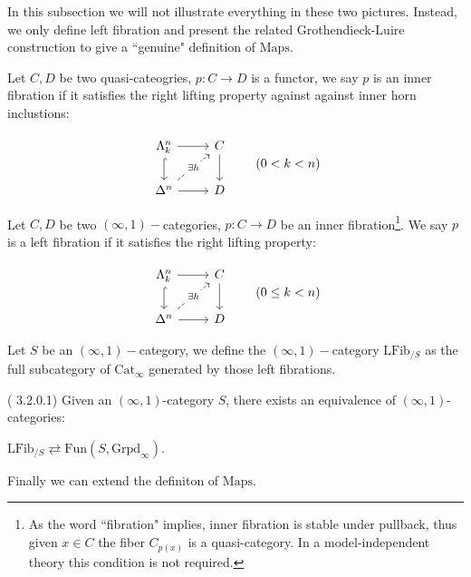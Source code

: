 In this subsection we will not illustrate everything in these two pictures. Instead, we only define left fibration and present the related Grothendieck-Luire construction to give a ``genuine" definition of $\text{Maps}$.


\begin{definition}
    Let $C,D$ be two quasi-cateogries, $p:C\to D$ is a functor, we say $p$ is an inner fibration if it satisfies the right lifting property against against inner horn inclustions:

\[
\begin{tikzcd}
\Lambda^n_k \arrow[r] \arrow[d, hook] & C \arrow[d] \\
\Delta^n \arrow[r] \arrow[ur, dashed, "\exists h" description] & D
\end{tikzcd}
\qquad(0 < k < n)
\]
\end{definition}

\begin{definition}
    Let $C,D$ be two $(\infty,1)-$categories, $p:C\to D$ be an inner fibration\footnote{As the word ``fibration" implies, inner fibration is stable under pullback, thus given $x\in C$ the fiber $C_{p(x)}$ is a quasi-category. In a model-independent theory this condition is not required.}. We say $p$ is a left fibration if it satisfies the right lifting property:

   \[
\begin{tikzcd}
\Lambda^n_k \arrow[r] \arrow[d, hook] & C \arrow[d] \\
\Delta^n \arrow[r] \arrow[ur, dashed, "\exists h" description] & D
\end{tikzcd}
\qquad (0\leq k < n)
\] 
\end{definition}


\begin{definition}
    Let $S$ be an $(\infty,1)-$category, we define the $(\infty,1)-$category $\text{LFib}_{/S}$ as the full subcategory of $\text{Cat}_\infty$ generated by those left fibrations.
\end{definition}

\begin{theorem}(\textcite{htt} 3.2.0.1)\label{3201}
    Given an $(\infty,1)$-category $S$, there exists an equivalence of $(\infty,1)$-categories:

    $\text{LFib}_{/S}\rightleftarrows\text{Fun}(S,\text{Grpd}_\infty)$.
\end{theorem}

Finally we can extend the definiton of $\text{Maps}$.

